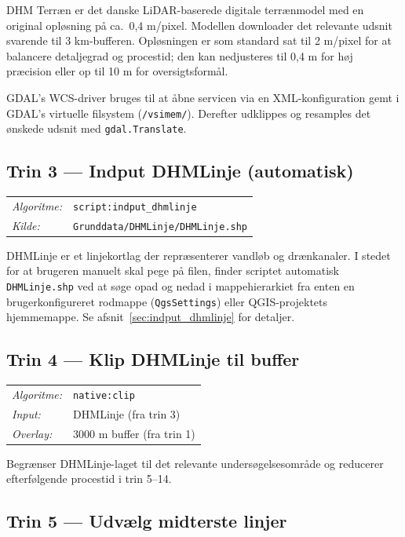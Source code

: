\medskip
DHM Terræn er det danske LiDAR-baserede digitale terrænmodel med en original
opløsning på ca.\ 0,4 m/pixel. Modellen downloader det relevante udsnit
svarende til 3 km-bufferen. Opløsningen er som standard sat til 2 m/pixel for
at balancere detaljegrad og procestid; den kan nedjusteres til 0,4 m for høj
præcision eller op til 10 m for oversigtsformål.

GDAL's WCS-driver bruges til at åbne servicen via en XML-konfiguration gemt i
GDAL's virtuelle filsystem (\texttt{/vsimem/}). Derefter udklippes og resamples
det ønskede udsnit med \texttt{gdal.Translate}.

\subsection{Trin 3 — Indput DHMLinje (automatisk)}

\begin{tabular}{ll}
  \textit{Algoritme:} & \texttt{script:indput\_dhmlinje} \\
  \textit{Kilde:}     & \texttt{Grunddata/DHMLinje/DHMLinje.shp} \\
\end{tabular}

\medskip
DHMLinje er et linjekortlag der repræsenterer vandløb og drænkanaler.
I stedet for at brugeren manuelt skal pege på filen, finder scriptet automatisk
\texttt{DHMLinje.shp} ved at søge opad og nedad i mappehierarkiet fra enten en
brugerkonfigureret rodmappe (\texttt{QgsSettings}) eller QGIS-projektets
hjemmemappe. Se afsnit~\ref{sec:indput_dhmlinje} for detaljer.

\subsection{Trin 4 — Klip DHMLinje til buffer}

\begin{tabular}{ll}
  \textit{Algoritme:} & \texttt{native:clip} \\
  \textit{Input:}     & DHMLinje (fra trin 3) \\
  \textit{Overlay:}   & 3000 m buffer (fra trin 1) \\
\end{tabular}

\medskip
Begrænser DHMLinje-laget til det relevante undersøgelsesområde og reducerer
efterfølgende procestid i trin 5–14.

\subsection{Trin 5 — Udvælg midterste linjer}

